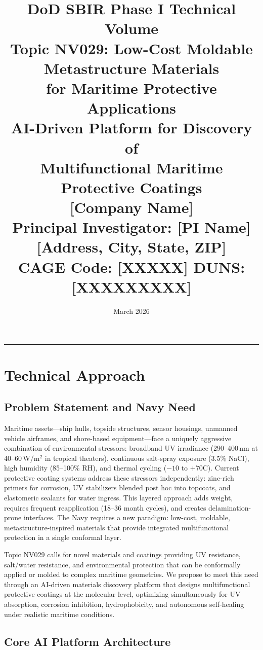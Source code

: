 \documentclass[11pt,letterpaper]{article}
\title{%
  \vspace{-1.5cm}
  \textcolor{navyblue}{\Large\textbf{DoD SBIR Phase I Technical Volume}}\\[0.3cm]
  \textcolor{navyblue}{\large Topic NV029: Low-Cost Moldable Metastructure Materials\\
  for Maritime Protective Applications}\\[0.4cm]
  \textbf{AI-Driven Platform for Discovery of\\
  Multifunctional Maritime Protective Coatings}\\[0.3cm]
  \large [Company Name]\\[0.2cm]
  \normalsize Principal Investigator: [PI Name]\\
  \normalsize [Address, City, State, ZIP]\\
  \normalsize CAGE Code: [XXXXX] \quad DUNS: [XXXXXXXXX]
}
\author{}
\date{March 2026}
\begin{document}
\maketitle
\thispagestyle{fancy}

\noindent\textcolor{navyblue}{\rule{\textwidth}{1.5pt}}

\section{Technical Approach}
\label{sec:technical_approach}

\subsection{Problem Statement and Navy Need}

Maritime assets---ship hulls, topside structures, sensor housings, unmanned vehicle
airframes, and shore-based equipment---face a uniquely aggressive combination of
environmental stressors: broadband UV irradiance (290--400\,nm at 40--60\,W/m$^2$
in tropical theaters), continuous salt-spray exposure (3.5\% NaCl), high humidity
(85--100\% RH), and thermal cycling ($-10$ to $+70$\textdegree C). Current
protective coating systems address these stressors independently:
zinc-rich primers for corrosion, UV stabilizers blended post hoc into topcoats,
and elastomeric sealants for water ingress. This layered approach adds weight,
requires frequent reapplication (18--36 month cycles), and creates
delamination-prone interfaces. The Navy requires a new paradigm: low-cost,
moldable, metastructure-inspired materials that provide integrated
multifunctional protection in a single conformal layer.

Topic NV029 calls for novel materials and coatings providing UV resistance,
salt/water resistance, and environmental protection that can be conformally
applied or molded to complex maritime geometries. We propose to meet this need
through an AI-driven materials discovery platform that designs multifunctional
protective coatings at the molecular level, optimizing simultaneously for
UV absorption, corrosion inhibition, hydrophobicity, and autonomous self-healing
under realistic maritime conditions.

\subsection{Core AI Platform Architecture}
\end{document}
